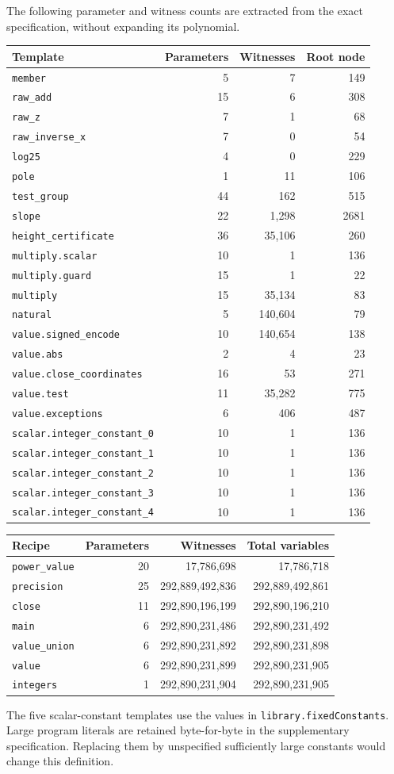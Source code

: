 The following parameter and witness counts are extracted from the exact
specification, without expanding its polynomial.
\begin{longtable}{p{}rrr}
\toprule Template & Parameters & Witnesses & Root node\\\midrule\endhead
\nolinkurl{member} & 5 & 7 & 149\\
\nolinkurl{raw_add} & 15 & 6 & 308\\
\nolinkurl{raw_z} & 7 & 1 & 68\\
\nolinkurl{raw_inverse_x} & 7 & 0 & 54\\
\nolinkurl{log25} & 4 & 0 & 229\\
\nolinkurl{pole} & 1 & 11 & 106\\
\nolinkurl{test_group} & 44 & 162 & 515\\
\nolinkurl{slope} & 22 & 1,298 & 2681\\
\nolinkurl{height_certificate} & 36 & 35,106 & 260\\
\nolinkurl{multiply.scalar} & 10 & 1 & 136\\
\nolinkurl{multiply.guard} & 15 & 1 & 22\\
\nolinkurl{multiply} & 15 & 35,134 & 83\\
\nolinkurl{natural} & 5 & 140,604 & 79\\
\nolinkurl{value.signed_encode} & 10 & 140,654 & 138\\
\nolinkurl{value.abs} & 2 & 4 & 23\\
\nolinkurl{value.close_coordinates} & 16 & 53 & 271\\
\nolinkurl{value.test} & 11 & 35,282 & 775\\
\nolinkurl{value.exceptions} & 6 & 406 & 487\\
\nolinkurl{scalar.integer_constant_0} & 10 & 1 & 136\\
\nolinkurl{scalar.integer_constant_1} & 10 & 1 & 136\\
\nolinkurl{scalar.integer_constant_2} & 10 & 1 & 136\\
\nolinkurl{scalar.integer_constant_3} & 10 & 1 & 136\\
\nolinkurl{scalar.integer_constant_4} & 10 & 1 & 136\\
\bottomrule\end{longtable}

\begin{longtable}{lrrr}
\toprule Recipe & Parameters & Witnesses & Total variables\\\midrule\endhead
\nolinkurl{power_value} & 20 & 17,786,698 & 17,786,718\\
\nolinkurl{precision} & 25 & 292,889,492,836 & 292,889,492,861\\
\nolinkurl{close} & 11 & 292,890,196,199 & 292,890,196,210\\
\nolinkurl{main} & 6 & 292,890,231,486 & 292,890,231,492\\
\nolinkurl{value_union} & 6 & 292,890,231,892 & 292,890,231,898\\
\nolinkurl{value} & 6 & 292,890,231,899 & 292,890,231,905\\
\nolinkurl{integers} & 1 & 292,890,231,904 & 292,890,231,905\\
\bottomrule\end{longtable}


The five scalar-constant templates use the values in
\texttt{library.fixedConstants}. Large program literals are retained
byte-for-byte in the supplementary specification. Replacing them by
unspecified sufficiently large constants would change this definition.

